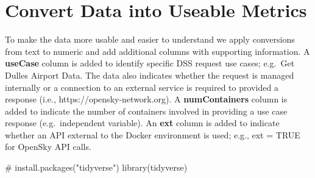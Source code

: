 \documentclass[
  letterpaper,
  DIV=11,
  numbers=noendperiod]{scrartcl}
\newenvironment{Shaded}{\begin{snugshade}}{\end{snugshade}}
\newcommand{\CommentTok}[1]{\textcolor[rgb]{0.37,0.37,0.37}{#1}}
\newcommand{\FunctionTok}[1]{\textcolor[rgb]{0.28,0.35,0.67}{#1}}
\newcommand{\NormalTok}[1]{\textcolor[rgb]{0.00,0.23,0.31}{#1}}
\begin{document}
\hypertarget{convert-data-into-useable-metrics}{%
\section{Convert Data into Useable
Metrics}\label{convert-data-into-useable-metrics}}

To make the data more usable and easier to understand we apply
conversions from text to numeric and add additional columns with
supporting information. A \textbf{useCase} column is added to identify
specific DSS request use cases; e.g.~Get Dulles Airport Data. The data
also indicates whether the request is managed internally or a connection
to an external service is required to provided a response (i.e.,
https://opensky-network.org). A \textbf{numContainers} column is added
to indicate the number of containers involved in providing a use case
response (e.g.~independent variable). An \textbf{ext} column is added to
indicate whether an API external to the Docker environment is used;
e.g., ext = TRUE for OpenSky API calls.

\begin{Shaded}
\begin{Highlighting}[]
\CommentTok{\# install.packages("tidyverse")}
\FunctionTok{library}\NormalTok{(tidyverse)}
\end{Highlighting}
\end{Shaded}
\end{document}
